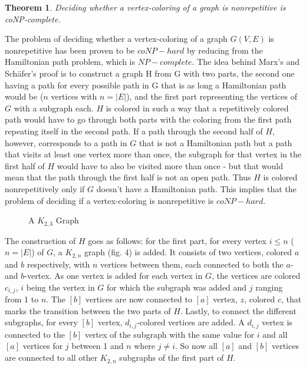 \documentclass[12pt,a4paper]{article}
\newtheorem{theorem}{Theorem}
\begin{document}
\begin{theorem}
Deciding whether a vertex-coloring of a graph is nonrepetitive is coNP-complete. \citep{Marx2009a}
\end{theorem}
The problem of deciding whether a vertex-coloring of a graph $G(V, E)$ is nonrepetitive has been proven to be $coNP-hard$ by reducing from the Hamiltonian path problem, which is $NP-complete$. The idea behind Marx's and Schäfer's proof is to construct a graph H from G with two parts, the second one having a path for every possible path in G that is as long a Hamiltonian path would be ($n$ vertices with $n = |E|$), and the first part representing the vertices of $G$ with a subgraph each. $H$ is colored in such a way that a repetitively colored path would have to go through both parts with the coloring from the first path repeating itself in the second path. If a path through the second half of $H$, however, corresponds to a path in $G$ that is not a Hamiltonian path but a path that visits at least one vertex more than once, the subgraph for that vertex in the first half of $H$ would have to also be visited more than once - but that would mean that the path through the first half is not an open path. Thus $H$ is colored nonrepetitively only if $G$ doesn't have a Hamiltonian path. This implies that the problem of deciding if a vertex-coloring is nonrepetitive is $coNP-hard$.
\newline
\begin{wrapfigure}[9]{l}{3cm}
	
	\caption{A $K_{2,3}$ Graph}
\end{wrapfigure}
The construction of $H$ goes as follows: for the first part, for every vertex $i \leq n$ ($n = |E|$) of $G$, a $K_{2, n}$ graph (fig. 4) is added. It consists of two vertices, colored $a$ and $b$ respectively, with $n$ vertices between them, each connected to both the $a$- and $b$-vertex. As one vertex is added for each vertex in $G$, the vertices are colored $c_{i,j}$, $i$ being the vertex in $G$ for which the subgraph was added and $j$ ranging from 1 to $n$. The $[b]$ vertices are now connected to $[a]$ vertex, $z$, colored $c$, that marks the transition between the two parts of $H$. Lastly, to connect the different subgraphs, for every $[b]$ vertex, $d_{i,j}$-colored vertices are added. A $d_{i, j}$ vertex is connected to the $[b]$ vertex of the subgraph with the same value for $i$ and all $[a]$ vertices for $j$ between 1 and $n$ where $j \neq i$.  So now all $[a]$ and $[b]$ vertices are connected to all other $K_{2,n}$ subgraphs of the first part of $H$.
\end{document}
